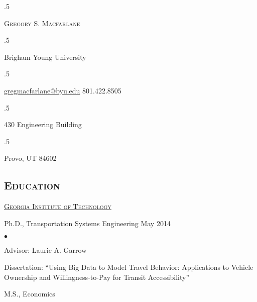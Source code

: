 \documentclass[margin,line]{res}
\newenvironment{list1}{
  \begin{list}{\ding{113}}{%
      \setlength{\itemsep}{0in}
      \setlength{\parsep}{0in} \setlength{\parskip}{0in}
      \setlength{\topsep}{0in} \setlength{\partopsep}{0in}
      \setlength{\leftmargin}{0.17in}}}{\end{list}}
\newenvironment{list2}{
  \begin{list}{$\bullet$}{%
      \setlength{\itemsep}{0in}
      \setlength{\parsep}{0in} \setlength{\parskip}{0in}
      \setlength{\topsep}{0in} \setlength{\partopsep}{0in}
      \setlength{\leftmargin}{0.2in}}}{\end{list}}
\newcommand{\secfont}{\scshape }
\newcommand{\acc}{\scshape }
\begin{document}
 \moveleft.5\hoffset\centerline{\LARGE\scshape Gregory S.  Macfarlane}
\vspace{.05in}
 \moveleft.5\hoffset\centerline{Brigham Young University}
 \moveleft.5\hoffset\centerline{
	 \href{mailto:gregmacfarlane@byu.edu}{gregmacfarlane@byu.edu}
   801.422.8505}
\vspace{.05in}
 \moveleft.5\hoffset\centerline{430 Engineering Building}
 \moveleft.5\hoffset\centerline{Provo, UT 84602}

\begin{resume}

\vspace{.05in}


\section{\secfont Education}
\href{http://www.gatech.edu}{\acc Georgia Institute of Technology}
\\
	\vspace*{-.1in}
	\begin{list1}
	\item[] Ph.D., Transportation Systems Engineering \hfill May 2014
	\begin{list2}
  	\item[] Advisor: Laurie A. Garrow
		\item[] Dissertation: ``Using Big Data to Model Travel Behavior: Applications to Vehicle Ownership and Willingness-to-Pay for Transit Accessibility''
  \end{list2}
	\vspace*{.05in}
	\item[]M.S., Economics
	\end{list1}


\end{resume}
\end{document}
